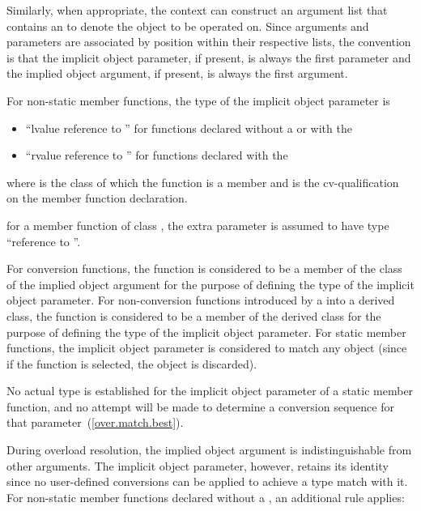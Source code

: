 \pnum
Similarly, when appropriate, the context can construct an
argument list that contains an
to denote
the object to be operated on.
Since arguments and parameters are
associated by position within their respective lists, the
convention is that the implicit object parameter, if present, is
always the first parameter and the implied object argument, if
present, is always the first argument.

\pnum
For non-static member functions, the type of the implicit object
parameter is

\begin{itemize}
\item ``lvalue reference to \cv{} '' for functions declared
without a  or with the
\tcode{\&} 
\item ``rvalue reference to \cv{} '' for functions declared with the
\tcode{\&\&} 
\end{itemize}

where
is the class of which the function is a member and
\cv{}
is the cv-qualification on the
member function declaration.
\begin{example}
for a
member
function of class
,
the extra parameter is assumed to have type
``reference to
''.
\end{example}
For conversion functions, the function is considered to be a member of the
class of the implied object argument for the purpose of defining the
type of the implicit object parameter.
For non-conversion functions
introduced by a
into a derived class, the function is
considered to be a member of the derived class for the purpose of defining
the type of the implicit object parameter.
For static member functions, the implicit object parameter is considered
to match any object (since if the function is selected, the object is
discarded).
\begin{note}
No actual type is established for the implicit object parameter
of a static member function, and no attempt will be made to determine a
conversion sequence for that parameter~(\ref{over.match.best}).
\end{note}

\pnum
{}%
During overload resolution, the implied object argument is
indistinguishable from other arguments.
The implicit object
parameter, however, retains its identity since
no user-defined conversions can be applied to achieve a type
match with it.
%
For non-static member functions declared without a ,
an additional rule applies:

